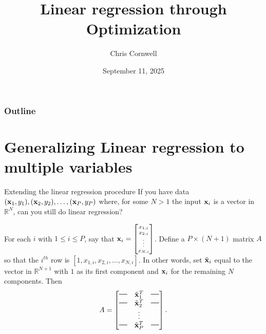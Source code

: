 \documentclass{beamer}
\author{Chris Cornwell}
\date{September 11, 2025}
\title{Linear regression through Optimization}
\theoremstyle{example}
\newcommand{\bb}[1]{\mathbb{#1}}
\begin{document}
\begin{frame}
\titlepage
\end{frame}

\begin{frame}
\frametitle{Outline}
\tableofcontents
\end{frame}

\section{Generalizing Linear regression to multiple variables}

\begin{frame}{Extending the linear regression procedure}
    If you have data $({\bf x}_1,y_1), ({\bf x}_2,y_2), \ldots, ({\bf x}_P, y_P)$ where, for some $N>1$ the input ${\bf x}_i$ is a vector in $\bb R^N$, can you still do linear regression?

    \pause
    For each $i$ with $1\le i\le P$, say that ${\bf x}_i = {\scriptsize \begin{bmatrix}x_{1,i}\\ x_{2,i}\\ \vdots\\ x_{N,i}\end{bmatrix}}$. Define a $P\times(N+1)$ matrix $A$ so that the $i^{th}$ row is $[1, x_{1,i}, x_{2,i}, \ldots, x_{N,i}]$.\pause \newline 
    In other words, set $\tilde{\bf x}_i$ equal to the vector in $\bb R^{N+1}$ with $1$ as its first component and ${\bf x}_i$ for the remaining $N$ components. Then 
        \[A = \begin{bmatrix} \overset{\rule{0.4cm}{0.02cm}}{\phantom{.}} & \tilde{\bf x}_1^T & \overset{\rule{0.4cm}{0.02cm}}{\phantom{.}} \\ \overset{\rule{0.4cm}{0.02cm}}{\phantom{.}} & \tilde{\bf x}_2^T & \overset{\rule{0.4cm}{0.02cm}}{\phantom{.}} \\ & \vdots & \\ \overset{\rule{0.4cm}{0.02cm}}{\phantom{.}} & \tilde{\bf x}_P^T & \overset{\rule{0.4cm}{0.02cm}}{\phantom{.}} \end{bmatrix}.\]
\end{frame}
\end{document}
